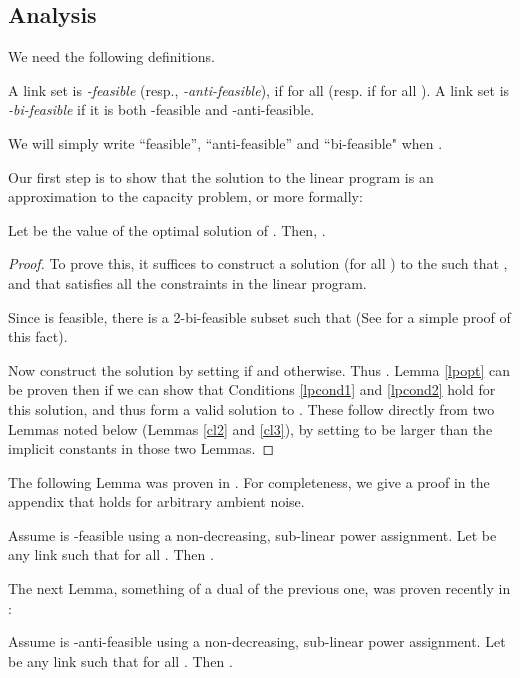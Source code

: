 \documentclass[11pt]{amsart}
\begin{document}
\subsection{Analysis}
We need the following definitions.
\begin{defn}
A link set  is \emph{-feasible} (resp., \emph{-anti-feasible}), if  for all  (resp. if  for all ). A link set is \emph{-bi-feasible} if it is both -feasible and -anti-feasible.
\end{defn}
We will simply write ``feasible'', ``anti-feasible'' and ``bi-feasible" when .



Our first step is to show that the solution to the linear program is an approximation to the 
capacity problem, or more formally:
\begin{lemma}
Let  be the value of the optimal solution of . Then, .
\label{lpopt}
\end{lemma}
\begin{proof}
To prove this, it suffices to construct a solution  (for all ) to the  such that
, and that satisfies all the constraints in the linear program.

Since  is feasible, there is a 2-bi-feasible subset  such that  (See \cite{icalp11} for a simple proof of this
fact).

Now construct the solution by setting
 if  and  otherwise. Thus .  Lemma \ref{lpopt}
can be proven then if we can show that Conditions  \ref{lpcond1} and \ref{lpcond2} hold for this solution, and thus form a valid
solution to . These follow directly from two Lemmas noted below (Lemmas \ref{cl2} and \ref{cl3}), by setting
 to be larger than the implicit constants in those two Lemmas.
\end{proof}


The following Lemma was proven in \cite{KV10}. For completeness, we give a proof in the
appendix that holds for arbitrary ambient noise.
\begin{lemma}
Assume  is -feasible using a non-decreasing, sub-linear power assignment. Let  be any link such that  for all . Then .
\label{cl2}
\end{lemma}

The next Lemma, something of a dual of the previous one, was proven recently in \cite{icalp11}:
\begin{lemma}
Assume  is -anti-feasible using a non-decreasing, sub-linear power assignment. Let  be any link such that  for all . Then .
\label{cl3}
\end{lemma}
\end{document}
